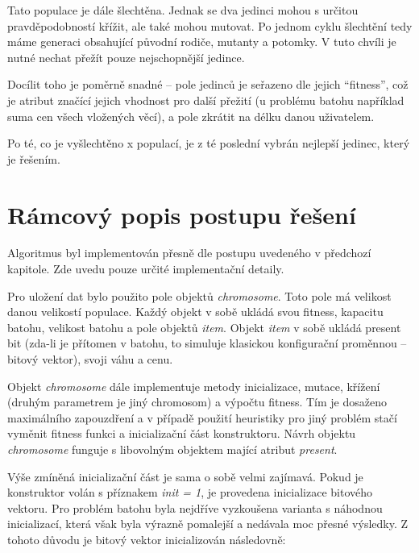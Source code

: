 \documentclass[a4paper]{article}
\begin{document}
	Tato populace je dále šlechtěna. Jednak se dva jedinci mohou s určitou pravděpodobností křížit, ale také mohou mutovat. Po jednom cyklu šlechtění tedy máme generaci obsahující původní rodiče, mutanty a potomky. V tuto chvíli je nutné nechat přežít pouze nejschopnější jedince.
	
	Docílit toho je poměrně snadné -- pole jedinců je seřazeno dle jejich \enquote{fitness}, což je atribut značící jejich vhodnost pro další přežití (u problému batohu například suma cen všech vložených věcí), a pole zkrátit na délku danou uživatelem.
	
	Po té, co je vyšlechtěno x populací, je z té poslední vybrán nejlepší jedinec, který je řešením.
	

\section{Rámcový popis postupu řešení}
	Algoritmus byl implementován přesně dle postupu uvedeného v předchozí kapitole. Zde uvedu pouze určité implementační detaily.
	
	Pro uložení dat bylo použito pole objektů \textit{chromosome}. Toto pole má velikost danou velikostí populace. Každý objekt v sobě ukládá svou fitness, kapacitu batohu, velikost batohu a pole objektů \textit{item}. Objekt \textit{item} v sobě ukládá present bit (zda-li je přítomen v batohu, to simuluje klasickou konfigurační proměnnou -- bitový vektor), svoji váhu a cenu. 
	
	Objekt \textit{chromosome} dále implementuje metody inicializace, mutace, křížení (druhým parametrem je jiný chromosom) a výpočtu fitness. Tím je dosaženo maximálního zapouzdření a v případě použití heuristiky pro jiný problém stačí vyměnit fitness funkci a inicializační část konstruktoru. Návrh objektu \textit{chromosome} funguje s libovolným objektem mající atribut \textit{present}.
	
	Výše zmíněná inicializační část je sama o sobě velmi zajímavá. Pokud je konstruktor volán s příznakem \textit{init = 1}, je provedena inicializace bitového vektoru. Pro problém batohu byla nejdříve vyzkoušena varianta s náhodnou inicializací, která však byla výrazně pomalejší a nedávala moc přesné výsledky. Z tohoto důvodu je bitový vektor inicializován následovně:
	
\end{document}
